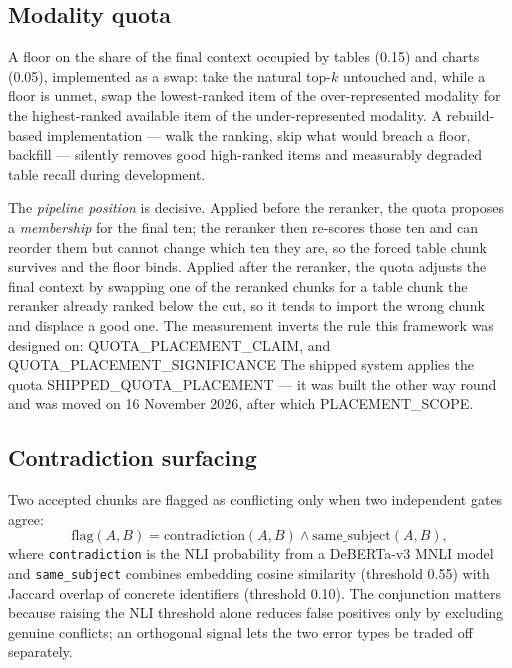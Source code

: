 \documentclass[preprint,3p,times]{elsarticle}
\begin{document}
\subsection{Modality quota}

A floor on the share of the final context occupied by tables (0.15) and charts
(0.05), implemented as a swap: take the natural top-$k$ untouched and, while a
floor is unmet, swap the lowest-ranked item of the over-represented modality
for the highest-ranked available item of the under-represented modality. A
rebuild-based implementation --- walk the ranking, skip what would breach a
floor, backfill --- silently removes good high-ranked items and measurably
degraded table recall during development.

The \emph{pipeline position} is decisive. Applied before the reranker, the
quota proposes a \emph{membership} for the final ten; the reranker then
re-scores those ten and can reorder them but cannot change which ten they are,
so the forced table chunk survives and the floor binds. Applied after the
reranker, the quota adjusts the final context by swapping one of the reranked
chunks for a table chunk the reranker already ranked below the cut, so it
tends to import the wrong chunk and displace a good one. The measurement inverts the rule this framework was designed on:
{{QUOTA_PLACEMENT_CLAIM}}, and {{QUOTA_PLACEMENT_SIGNIFICANCE}} The shipped system applies
the quota {{SHIPPED_QUOTA_PLACEMENT}} --- it was built the other way round and
was moved on 16 November 2026, after which
{{PLACEMENT_SCOPE}}.

\subsection{Contradiction surfacing}

Two accepted chunks are flagged as conflicting only when two independent gates
agree:
\begin{equation}
\mathrm{flag}(A,B)=\mathrm{contradiction}(A,B)\wedge\mathrm{same\_subject}(A,B),
\end{equation}
where \texttt{contradiction} is the NLI probability from a DeBERTa-v3 MNLI
model and \texttt{same\_subject} combines embedding cosine similarity
(threshold 0.55) with Jaccard overlap of concrete identifiers (threshold 0.10).
The conjunction matters because raising the NLI threshold alone reduces false
positives only by excluding genuine conflicts; an orthogonal signal lets the two
error types be traded off separately.
\end{document}
